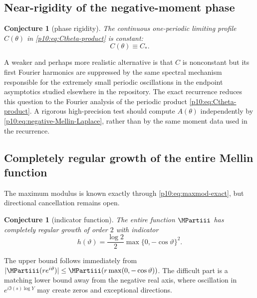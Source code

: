 \documentclass[11pt,oneside]{article}
\newtheorem{conjecture}[theorem]{Conjecture}
\theoremstyle{definition}
\theoremstyle{remark}
\newcommand{\1}{\mathbf 1}
\begin{document}
\subsection{Near-rigidity of the negative-moment phase}

\begin{conjecture}[phase rigidity]\label{p10:conj:phase-constant}
The continuous one-periodic limiting profile \(C(\theta)\) in
\cref{p10:eq:Ctheta-product} is constant:
\begin{equation}\label{p10:eq:Ctheta-conjecture}
 C(\theta)\equiv C_*.
\end{equation}
\end{conjecture}

A weaker and perhaps more realistic alternative is that \(C\) is nonconstant but its
first Fourier harmonics are suppressed by the same spectral mechanism responsible for
the extremely small periodic oscillations in the endpoint asymptotics studied elsewhere
in the repository.  The exact recurrence reduces this question to the Fourier analysis
of the periodic product \cref{p10:eq:Ctheta-product}.  A rigorous high-precision
test should compute \(A(\theta)\) independently by \cref{p10:eq:negative-Mellin-Laplace},
rather than by the same moment data used in the recurrence.

\subsection{Completely regular growth of the entire Mellin function}

The maximum modulus is known exactly through \cref{p10:eq:maxmod-exact}, but directional
cancellation remains open.

\begin{conjecture}[indicator function]\label{p10:conj:indicator}
The entire function \(\MPartiii\) has completely regular growth of order \(2\) with indicator
\begin{equation}\label{p10:eq:indicator-conjecture}
 h(\vartheta)=\frac{\log2}{2}
 \max\{0,-\cos\vartheta\}^2.
\end{equation}
\end{conjecture}

The upper bound follows immediately from
\(|\MPartiii(re^{i\vartheta})|\le\MPartiii(r\max(0,-\cos\vartheta))\).  The difficult part is a
matching lower bound away from the negative real axis, where oscillation in
\(e^{i\Im(s)\log Y}\) may create zeros and exceptional directions.
\end{document}
